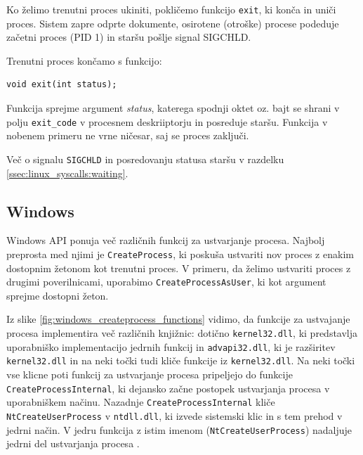 \documentclass[a4paper,12pt,openright]{book}
\begin{document}
Ko želimo trenutni proces ukiniti, pokličemo funkcijo \texttt{exit}, ki konča in uniči proces.
Sistem zapre odprte dokumente, osirotene (otroške) procese podeduje začetni proces (PID 1) in staršu pošlje signal SIGCHLD.

Trenutni proces končamo s funkcijo:
\begin{lstlisting}[style=func]
 void exit(int status);
\end{lstlisting}

Funkcija sprejme argument \textit{status}, katerega spodnji oktet oz. bajt se shrani v polju \texttt{exit\_code} v procesnem deskriiptorju in posreduje staršu.
Funkcija v nobenem primeru ne vrne ničesar, saj se proces zaključi.

Več o signalu \texttt{SIGCHLD} in posredovanju statusa staršu v razdelku \ref{ssec:linux_syscalls:waiting}.

\subsection{Windows}

Windows API ponuja več različnih funkcij za ustvarjanje procesa.
Najbolj preprosta med njimi je \texttt{CreateProcess}, ki poskuša ustvariti nov proces z enakim dostopnim žetonom kot trenutni proces.
V primeru, da želimo ustvariti proces z drugimi poverilnicami, uporabimo \texttt{CreateProcessAsUser}, ki kot argument sprejme dostopni žeton.

Iz slike \ref{fig:windows_createprocess_functions} vidimo, da funkcije za ustvajanje procesa implementira več različnih knjižnic: dotično \texttt{kernel32.dll}, ki predstavlja uporabniško implementacijo jedrnih funkcij in \texttt{advapi32.dll}, ki je razširitev \texttt{kernel32.dll} in na neki točki tudi kliče funkcije iz \texttt{kernel32.dll}.
Na neki točki vse klicne poti funkcij za ustvarjanje procesa pripeljejo do funkcije \texttt{CreateProcess\-Internal}, ki dejansko začne postopek ustvarjanja procesa v uporabniškem načinu.
Nazadnje \texttt{CreateProcessInternal} kliče \texttt{NtCreateUserProcess} v \texttt{ntdll.dll}, ki izvede sistemski klic in s tem prehod v jedrni način.
V jedru funkcija z istim imenom (\texttt{NtCreateUserProcess}) nadaljuje jedrni del ustvarjanja procesa \cite{Yosifovich_Russinovich_Solomon_Ionescu_2017}.
\end{document}

